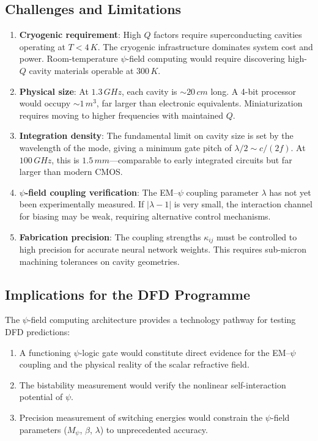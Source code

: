 \documentclass[12pt,a4paper,twoside]{article}
\begin{document}
\subsection{Challenges and Limitations}\label{sec:challenges}

\begin{enumerate}
\item \textbf{Cryogenic requirement}: High $Q$ factors require superconducting cavities operating at $T < 4\,\si{K}$. The cryogenic infrastructure dominates system cost and power. Room-temperature $\psi$-field computing would require discovering high-$Q$ cavity materials operable at $300\,\si{K}$.

\item \textbf{Physical size}: At $1.3\,\si{GHz}$, each cavity is ${\sim}20\,\si{cm}$ long. A 4-bit processor would occupy ${\sim}1\,\si{m}^3$, far larger than electronic equivalents. Miniaturization requires moving to higher frequencies with maintained $Q$.

\item \textbf{Integration density}: The fundamental limit on cavity size is set by the wavelength of the mode, giving a minimum gate pitch of $\lambda/2 \sim c/(2f)$. At $100\,\si{GHz}$, this is $1.5\,\si{mm}$---comparable to early integrated circuits but far larger than modern CMOS.

\item \textbf{$\psi$-field coupling verification}: The EM--$\psi$ coupling parameter $\lambda$ has not yet been experimentally measured. If $|\lambda - 1|$ is very small, the interaction channel for biasing may be weak, requiring alternative control mechanisms.

\item \textbf{Fabrication precision}: The coupling strengths $\kappa_{ij}$ must be controlled to high precision for accurate neural network weights. This requires sub-micron machining tolerances on cavity geometries.
\end{enumerate}

\subsection{Implications for the DFD Programme}\label{sec:implications}

The $\psi$-field computing architecture provides a technology pathway for testing DFD predictions:

\begin{enumerate}
\item A functioning $\psi$-logic gate would constitute direct evidence for the EM--$\psi$ coupling and the physical reality of the scalar refractive field.
\item The bistability measurement would verify the nonlinear self-interaction potential of $\psi$.
\item Precision measurement of switching energies would constrain the $\psi$-field parameters ($M_\psi$, $\beta$, $\lambda$) to unprecedented accuracy.
\end{enumerate}
\end{document}
